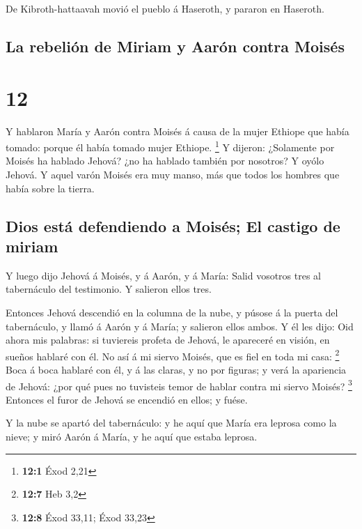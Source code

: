  De Kibroth-hattaavah movió el pueblo á Haseroth, y
pararon en Haseroth.

\hypertarget{la-rebeliuxf3n-de-miriam-y-aaruxf3n-contra-moisuxe9s}{%
\subsection{La rebelión de Miriam y Aarón contra
Moisés}\label{la-rebeliuxf3n-de-miriam-y-aaruxf3n-contra-moisuxe9s}}

\hypertarget{section-11}{%
\section{12}\label{section-11}}

 Y hablaron María y Aarón contra Moisés á causa de la
mujer Ethiope que había tomado: porque él había tomado mujer Ethiope.
\footnote{\textbf{12:1} Éxod 2,21}  Y dijeron: ¿Solamente
por Moisés ha hablado Jehová? ¿no ha hablado también por nosotros? Y
oyólo Jehová.  Y aquel varón Moisés era muy manso, más que
todos los hombres que había sobre la tierra.

\hypertarget{dios-estuxe1-defendiendo-a-moisuxe9s-el-castigo-de-miriam}{%
\subsection{Dios está defendiendo a Moisés; El castigo de
miriam}\label{dios-estuxe1-defendiendo-a-moisuxe9s-el-castigo-de-miriam}}

 Y luego dijo Jehová á Moisés, y á Aarón, y á María: Salid
vosotros tres al tabernáculo del testimonio. Y salieron ellos tres.

 Entonces Jehová descendió en la columna de la nube, y
púsose á la puerta del tabernáculo, y llamó á Aarón y á María; y
salieron ellos ambos.  Y él les dijo: Oid ahora mis
palabras: si tuviereis profeta de Jehová, le apareceré en visión, en
sueños hablaré con él.  No así á mi siervo Moisés, que es
fiel en toda mi casa: \footnote{\textbf{12:7} Heb 3,2} 
Boca á boca hablaré con él, y á las claras, y no por figuras; y verá la
apariencia de Jehová: ¿por qué pues no tuvisteis temor de hablar contra
mi siervo Moisés? \footnote{\textbf{12:8} Éxod 33,11; Éxod 33,23}
 Entonces el furor de Jehová se encendió en ellos; y
fuése.

 Y la nube se apartó del tabernáculo: y he aquí que María
era leprosa como la nieve; y miró Aarón á María, y he aquí que estaba
leprosa.

